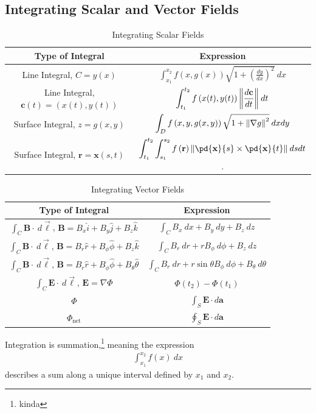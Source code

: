 \documentclass[10pt]{mypackage}
\begin{document}
\subsection{Integrating Scalar and Vector Fields}%
\begin{table}
  \centering
  \renewcommand{\arraystretch}{2.5}
  \begin{tabular}{c|c}
    Type of Integral & Expression\\
    \hline\hline
    Line Integral, $C = y(x)$ & $\displaystyle \int_{x_1}^{x_2} f\left(x,g(x)\right)\sqrt{1 + \left(\frac{dy}{dx}\right)^2}\:dx$\\
    Line Integral, $\mathbf{c}(t) = \left(x(t),y(t)\right)$ & $\displaystyle\int_{t_1}^{t_2}f\left(x(t),y(t)\right)\norm{\frac{d\mathbf{c}}{dt}}\:dt$\\
    \hline
    Surface Integral, $z = g(x,y)$ & $\displaystyle \int_{D}^{} f\left(x,y,g(x,y)\right)\sqrt{1 + \norm{\nabla g}^2}\:dxdy$\\
    Surface Integral, $\mathbf{r} = \mathbf{x} (s,t)$ & $\displaystyle \int_{t_1}^{t_2}\int_{s_1}^{s_2} f\left(\mathbf{r}\right)\norm{\pd{\mathbf{x}}{s}\times \pd{\mathbf{x}}{t}}\:dsdt$.
  \end{tabular}
  \caption{Integrating Scalar Fields}
\end{table}
\begin{table}
  \centering
  \renewcommand{\arraystretch}{2}
  \begin{tabular}{c|c}
    Type of Integral & Expression\\
    \hline\hline
    $\int_{C}^{} \mathbf{B}\cdot\:d\vec{\ell}$, $\mathbf{B} = B_x\hat{i} + B_y\hat{j} + B_z\hat{k}$ & $\displaystyle \int_{C} B_x\:dx + B_y\:dy + B_z\:dz$\\
    $\int_{C}^{} \mathbf{B}\cdot\:d\vec{\ell}$, $\mathbf{B} = B_r\hat{r} + B_{\phi}\hat{\phi} + B_z\hat{k}$ & $\displaystyle \int_{C} B_r\:dr + rB_{\phi}\:d\phi + B_z\:dz$\\
    $\int_{C}^{} \mathbf{B}\cdot\:d\vec{\ell}$, $\mathbf{B} = B_r\hat{r} + B_{\phi}\hat{\phi} + B_{\theta}\hat{\theta}$ & $\displaystyle \int_{C} B_{r}\:dr + r\sin\theta B_{\phi}\:d\phi + B_{\theta}\:d\theta$\\
    $\int_{C}^{} \mathbf{E}\cdot\:d\vec{\ell}$, $\mathbf{E} = \nabla \Phi$ & $\displaystyle \Phi\left(t_2\right) - \Phi\left(t_1\right)$\\
    \hline
    $\Phi$ & $\displaystyle \int_{S}\mathbf{E}\cdot d\mathbf{a}$\\
    $\Phi_{\text{net}}$ & $\displaystyle \oint_{S}\mathbf{E}\cdot d\mathbf{a}$
  \end{tabular}
  \caption{Integrating Vector Fields}
\end{table}
Integration is summation,\footnote{kinda} meaning the expression
\begin{align*}
  \int_{x_1}^{x_2} f(x)\:dx
\end{align*}
describes a sum along a unique interval defined by $x_1$ and $x_2$.\newline
\end{document}
